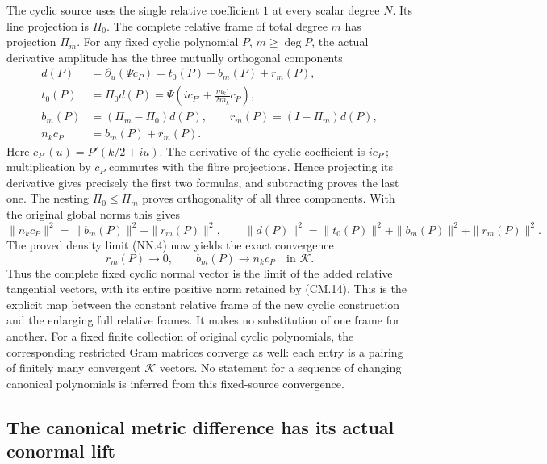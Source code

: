 The cyclic source uses the single relative coefficient \(1\) at every
scalar degree \(N\). Its line projection is \(\Pi_0\). The complete
relative frame of total degree \(m\) has projection \(\Pi_m\).
For any fixed cyclic polynomial \(P\), \(m\ge\deg P\), the actual
derivative amplitude has the three mutually orthogonal components
\[
 \begin{aligned}
 d(P)&=\partial_u(\Psi c_P)=t_0(P)+b_m(P)+r_m(P),\\
 t_0(P)&=\Pi_0d(P)
       =\Psi\left(ic_{P'}+\frac{m_k'}{2m_k}c_P\right),\\
 b_m(P)&=(\Pi_m-\Pi_0)d(P),\qquad
 r_m(P)=(I-\Pi_m)d(P),\\
 n_kc_P&=b_m(P)+r_m(P).
 \end{aligned}
 \tag{CM.13}
\]
Here \(c_{P'}(u)=P'(k/2+iu)\). The derivative of the cyclic
coefficient is \(ic_{P'}\); multiplication by \(c_P\) commutes with
the fibre projections. Hence projecting its derivative gives precisely
the first two formulas, and subtracting proves the last one.
The nesting \(\Pi_0\le\Pi_m\) proves orthogonality of all three
components. With the original global norms this gives
\[
 \|n_kc_P\|^2=\|b_m(P)\|^2+\|r_m(P)\|^2,\qquad
 \|d(P)\|^2=\|t_0(P)\|^2+\|b_m(P)\|^2+\|r_m(P)\|^2.
 \tag{CM.14}
\]
The proved density limit (NN.4) now yields the exact convergence
\[
 r_m(P)\to0,\qquad b_m(P)\to n_kc_P\quad\text{in }\mathscr K.
 \tag{CM.15}
\]
Thus the complete fixed cyclic normal vector is the limit of the added
relative tangential vectors, with its entire positive norm retained by
(CM.14). This is the explicit map between the constant relative frame
of the new cyclic construction and the enlarging full relative frames.
It makes no substitution of one frame for another. For a fixed finite
collection of original cyclic polynomials, the corresponding restricted
Gram matrices converge as well: each entry is a pairing of finitely
many convergent \(\mathscr K\) vectors. No statement for a sequence
of changing canonical polynomials is inferred from this fixed-source
convergence.

\subsection{The canonical metric difference has its actual conormal lift}

